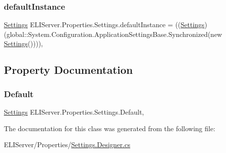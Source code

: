 \subsubsection{\texorpdfstring{default\+Instance}{defaultInstance}}
{\footnotesize\ttfamily \hyperlink{class_e_l_i_server_1_1_properties_1_1_settings}{Settings} E\+L\+I\+Server.\+Properties.\+Settings.\+default\+Instance = ((\hyperlink{class_e_l_i_server_1_1_properties_1_1_settings}{Settings})(global\+::\+System.\+Configuration.\+Application\+Settings\+Base.\+Synchronized(new \hyperlink{class_e_l_i_server_1_1_properties_1_1_settings}{Settings}())))\hspace{0.3cm}{\ttfamily [static]}, {\ttfamily [private]}}



\subsection{Property Documentation}
\mbox{\label{class_e_l_i_server_1_1_properties_1_1_settings_a16206a24735937907f927941b5b12095}} 
\subsubsection{\texorpdfstring{Default}{Default}}
{\footnotesize\ttfamily \hyperlink{class_e_l_i_server_1_1_properties_1_1_settings}{Settings} E\+L\+I\+Server.\+Properties.\+Settings.\+Default\hspace{0.3cm}{\ttfamily [static]}, {\ttfamily [get]}}



The documentation for this class was generated from the following file\+:\begin{DoxyCompactItemize}
\item 
E\+L\+I\+Server/\+Properties/\hyperlink{_settings_8_designer_8cs}{Settings.\+Designer.\+cs}\end{DoxyCompactItemize}
